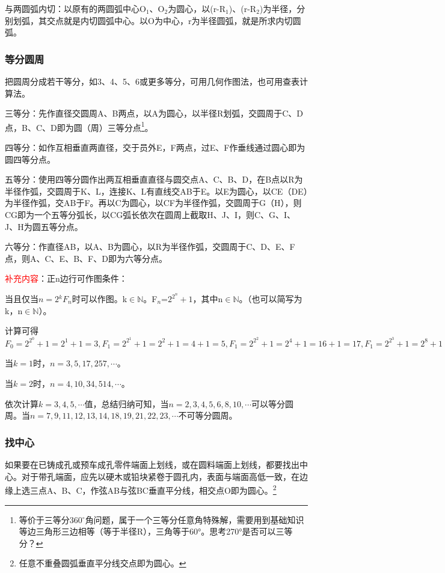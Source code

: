 \documentclass{ctexbook}
\begin{document}
与两圆弧内切：以原有的两圆弧中心O$_1$、O$_{2}$为圆心，以(r-R$_1$)、(r-R$_2$)为半径，分别划弧，其交点就是内切圆弧中心。以O为中心，r为半径圆弧，就是所求内切圆弧。
\subsubsection{等分圆周}
把圆周分成若干等分，如3、4、5、6或更多等分，可用几何作图法，也可用查表计算法。

三等分：先作直径交圆周A、B两点，以A为圆心，以半径R划弧，交圆周于C、D点，B、C、D即为圆（周）三等分点\footnote{等价于三等分360$^{\circ}$角问题，属于一个三等分任意角特殊解，需要用到基础知识等边三角形三边相等（等于半径R），三角等于60°。思考270°是否可以三等分？}。

四等分：如作互相垂直两直径，交于员外E，F两点，过E、F作垂线通过圆心即为圆四等分点。

五等分：使用四等分圆作出两互相垂直直径与圆交点A、C、B、D，在B点以R为半径作弧，交圆周于K、L，连接K、L有直线交AB于E。以E为圆心，以CE（DE）为半径作弧，交AB于F。再以C为圆心，以CF为半径作弧，交圆周于G（H），则CG即为一个五等分弧长，以CG弧长依次在圆周上截取H、J、I，则C、G、I、J、H为圆五等分点。

六等分：作直径AB，以A、B为圆心，以R为半径作弧，交圆周于C、D、E、F点，则A、C、E、B、F、D即为六等分点。

\textcolor{red}{\mbox{补充内容}}：正n边行可作图条件：

当且仅当$n=2{^k}F_{n}$时可以作图。k$\in \mathbb {N}$。F$_n$=$2^{2^{n}}+1$，其中n$\in \mathbb {N}$。（也可以简写为k，n$\in \mathbb{N}$）。

计算可得$F_{0}=2^{2^{0}}+1=2^1+1=3,F_{1}=2^{2^{1}}+1=2^{2}+1=4+1=5,F_{1}=2^{2^{2}}+1=2^{4}+1=16+1=17,F_{1}=2^{2^{3}}+1=2^{8}+1=256+1=257,F_{1}=2^{2^{4}}+1=2^{16}+1=65536+1=65537,\cdots$

当$k=1$时，$n=3,5,17,257,\cdots$。

当$k=2$时，$n=4,10,34,514,\cdots$。

依次计算$k=3,4,5,\cdots$值，总结归纳可知，当$n=2,3,4,5,6,8,10,\cdots$可以等分圆周。当$n=7,9,11,12,13,14,18,19,21,22,23,\cdots$不可等分圆周。
\subsubsection{找中心}
如果要在已铸成孔或预车成孔零件端面上划线，或在圆料端面上划线，都要找出中心。对于带孔端面，应先以硬木或铅块紧卷于圆孔内，表面与端面高低一致，在边缘上选三点A、B、C，作弦AB与弦BC垂直平分线，相交点O即为圆心。\footnote{任意不重叠圆弧垂直平分线交点即为圆心。}
\end{document}
